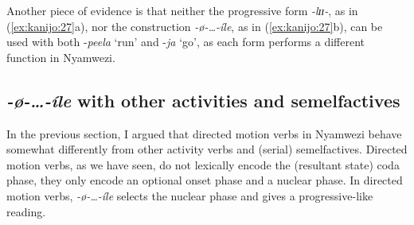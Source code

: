 \documentclass[output=paper,newtxmath,modfonts,nonflat,draftmode]{langsci/langscibook}
\begin{document}
Another piece of evidence is that neither the progressive form \textit{-lɪɪ-}, as in (\ref{ex:kanijo:27}a), nor the construction \textit{-ø-…-íle}, as in (\ref{ex:kanijo:27}b), can be used with both -\textit{peela} ‘run’ and -\textit{ja} ‘go’, as each form performs a different function in Nyamwezi. 

\ea \label{ex:kanijo:27}
\z
\z

\subsection{\textit{-ø-…-íle} with other activities and semelfactives} \label{sec:kanijo:4.4}

In the previous section, I argued that directed motion verbs in Nyamwezi behave somewhat differently from other activity verbs and (serial) semelfactives. Directed motion verbs, as we have seen, do not lexically encode the (resultant state) coda phase, they only encode an optional onset phase and a nuclear phase. In directed motion verbs, \textit{-ø-…-íle} selects the nuclear phase and gives a progressive-like reading.
\end{document}
